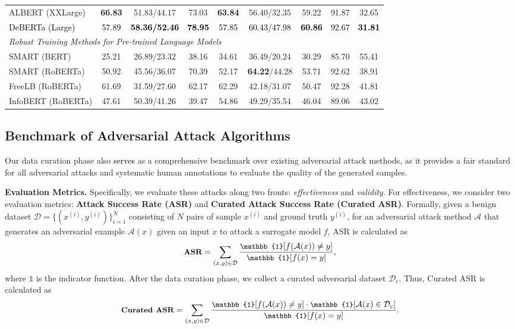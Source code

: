 \documentclass{article}
\newcommand{\m}[1]{{\textcolor{black}{{#1}}}}
\begin{document}
\begin{table}[t]
\begin{tabular}{l|ccccc|ccc}
    {ALBERT (XXLarge)} & \textbf{66.83} & 51.83/44.17 & 73.03 & \textbf{63.84} & 56.40/32.35  & 59.22 & 91.87 & 32.65 \\
    \m{{DeBERTa (Large)}} & \m{57.89} & \m{\textbf{58.36/52.46}} & \m{\textbf{78.95}} & \m{57.85} & \m{60.43/47.98} & \m{\textbf{60.86}} & \m{92.67} & \m{\textbf{31.81}} \\
\midrule 
    \multicolumn{8}{l}{\emph{Robust Training Methods for Pre-trained Language Models}} \\
    \midrule 
    {SMART (BERT)} & 25.21 & 26.89/23.32 & 38.16 & 34.61 & 36.49/20.24  & 30.29 & 85.70 & 55.41\\
    {SMART (RoBERTa)} & 50.92 & 45.56/36.07 & 70.39 & 52.17 & \textbf{64.22}/44.28  & 53.71 & 92.62 & 38.91 \\
    {FreeLB (RoBERTa)} & 61.69 & 31.59/27.60 & 62.17 & 62.29 & 42.18/31.07  & 50.47 & 92.28 & 41.81 \\
    {InfoBERT (RoBERTa)} & 47.61 & 50.39/41.26 & 39.47 & 54.86 & 49.29/35.54  & 46.04 & 89.06 & 43.02 \\
    \bottomrule
    \end{tabular}
\end{table}



\subsection{Benchmark of Adversarial Attack Algorithms}
\label{sec:attack}
Our data curation phase also \m{serves} as a comprehensive benchmark over existing  adversarial attack methods, as it provides a fair standard for all adversarial attacks and systematic human annotations to evaluate the quality of the generated samples.

\textbf{Evaluation Metrics.} Specifically, we evaluate these attacks along two fronts: \textit{effectiveness} and \textit{validity}.
For effectiveness, we consider two evaluation metrics: \textbf{Attack Success Rate (ASR)} and \textbf{Curated Attack Success Rate (Curated ASR)}.  
Formally, given a benign dataset $\mathcal{D}=\{(x^{(i)}, y^{(i)})\}^N_{i=1}$ consisting of $N$ pairs of sample $x^{(i)}$ and ground truth $y^{(i)}$, for an adversarial attack method $\mathcal{A}$ that generates an adversarial example $\mathcal{A}(x)$ given an input $x$ to attack a surrogate model $f$, ASR is calculated as
\begin{equation}\small
    \textbf{ASR} =  \sum_{(x,y) \in \mathcal{D}} \frac{\mathbb{1}[f(\mathcal{A}(x)) \neq y]}{\mathbb{1}[f(x) = y]},
\end{equation}
where $\mathbb{1}$ is the indicator function.
After the data curation phase, we collect a curated adversarial dataset $\mathcal{D}_c$. Thus, Curated ASR is calculated as 
\begin{equation}\small
    \textbf{Curated ASR} =  \sum_{(x,y) \in \mathcal{D}} \frac{\mathbb{1}[f(\mathcal{A}(x)) \neq y] \cdot \mathbb{1}[\mathcal{A}(x) \in \mathcal{D}_c]}{\mathbb{1}[f(x) = y]}.
\end{equation}
\end{document}
